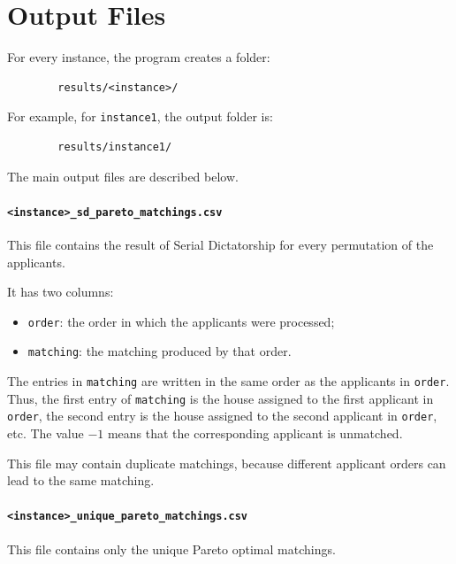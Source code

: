 \documentclass[12pt]{report}
\numberwithin{algorithm}{chapter}
\begin{document}
	\section{Output Files}
	
	For every instance, the program creates a folder:
	
	\begin{verbatim}
		results/<instance>/
	\end{verbatim}
	
	For example, for \texttt{instance1}, the output folder is:
	
	\begin{verbatim}
		results/instance1/
	\end{verbatim}
	
	The main output files are described below.
	
	\paragraph{\texttt{<instance>\_sd\_pareto\_matchings.csv}}
	
	This file contains the result of Serial Dictatorship for every permutation of the applicants.
	
	It has two columns:
	
	\begin{itemize}
		\item \texttt{order}: the order in which the applicants were processed;
		\item \texttt{matching}: the matching produced by that order.
	\end{itemize}
	
	The entries in \texttt{matching} are written in the same order as the applicants in \texttt{order}. Thus, the first entry of \texttt{matching} is the house assigned to the first applicant in \texttt{order}, the second entry is the house assigned to the second applicant in \texttt{order}, etc. The value $-1$ means that the corresponding applicant is unmatched.
	
	This file may contain duplicate matchings, because different applicant orders can lead to the same matching.
	
	\paragraph{\texttt{<instance>\_unique\_pareto\_matchings.csv}}
	
	This file contains only the unique Pareto optimal matchings.
	
\end{document}
